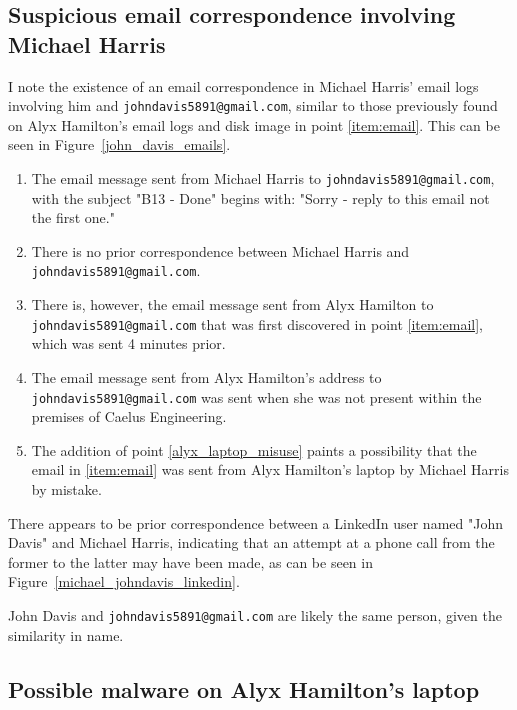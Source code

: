 \subsection{Suspicious email correspondence involving Michael Harris} %
\label{sub:Suspicious email correspondence involving Michael Harris}
\begin{myenum}
    \item \label{email-michael-to-johndavis} I note the existence of an email correspondence in Michael Harris' email logs involving him and \texttt{johndavis5891@gmail.com}, similar to those previously found on Alyx Hamilton's email logs and disk image in point \ref{item:email}. This can be seen in Figure~\ref{john_davis_emails}.
        \begin{enumerate}
            \item The email message sent from Michael Harris to \texttt{johndavis5891@gmail.com}, with the subject "B13 - Done" begins with: "Sorry - reply to this email not the first one." 
            \item There is no prior correspondence between Michael Harris and \texttt{johndavis5891@gmail.com}.
            \item There is, however, the email message sent from Alyx Hamilton to \texttt{johndavis5891@gmail.com} that was first discovered in point \ref{item:email}, which was sent 4 minutes prior.
            \item The email message sent from Alyx Hamilton's address to \texttt{johndavis5891@gmail.com} was sent when she was not present within the premises of Caelus Engineering.
            \item The addition of point \ref{alyx_laptop_misuse} paints a possibility that the email in \ref{item:email} was sent from Alyx Hamilton's laptop by Michael Harris by mistake.
        \end{enumerate}
    \item There appears to be prior correspondence between a LinkedIn user named "John Davis" and Michael Harris, indicating that an attempt at a phone call from the former to the latter may have been made, as can be seen in Figure~\ref{michael_johndavis_linkedin}. 
    \item John Davis and \texttt{johndavis5891@gmail.com} are likely the same person, given the similarity in name.
\end{myenum}

\subsection{Possible malware on Alyx Hamilton's laptop} %
\label{sub:Possible malware on Alyx Hamilton's laptop}


